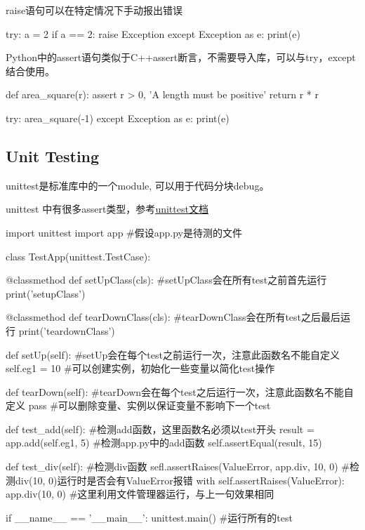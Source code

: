 raise语句可以在特定情况下手动报出错误
\begin{codeblock}[language=python, caption={Raise an error}]
  try:
  a = 2
  if a == 2:
  raise Exception
  except Exception as e:
  print(e)
\end{codeblock}

Python中的assert语句类似于C++assert断言，不需要导入库，可以与try，except结合使用。
\begin{codeblock}[language=python, caption={assert in python}]
  def area_square(r):
  assert r > 0, 'A length must be positive'
  return r * r
  
  try:
  area_square(-1)
  except Exception as e:
  print(e)
\end{codeblock}

\subsection{Unit Testing}
unittest是标准库中的一个module, 可以用于代码分块debug。 

unittest 中有很多assert类型，参考\href{https://docs.python.org/3/library/unittest.html#module-unittest}{\underline{unittest文档}}
\begin{codeblock}[language=python, caption={Unit Testing}]
  import unittest
  import app #假设app.py是待测的文件
  
  class TestApp(unittest.TestCase):
  
  @classmethod
  def setUpClass(cls): #setUpClass会在所有test之前首先运行
  print('setupClass')
  
  @classmethod
  def tearDownClass(cls): #tearDownClass会在所有test之后最后运行
  print('teardownClass')
  
  def setUp(self): #setUp会在每个test之前运行一次，注意此函数名不能自定义
  self.eg1 = 10 #可以创建实例，初始化一些变量以简化test操作
  
  def tearDown(self): #tearDown会在每个test之后运行一次，注意此函数名不能自定义
  pass #可以删除变量、实例以保证变量不影响下一个test
  
  def test_add(self): #检测add函数，这里函数名必须以test开头
  result = app.add(self.eg1, 5) #检测app.py中的add函数
  self.assertEqual(result, 15)
  
  def test_div(self): #检测div函数
  sefl.assertRaises(ValueError, app.div, 10, 0)
  #检测div(10, 0)运行时是否会有ValueError报错
  with self.assertRaises(ValueError):
  app.div(10, 0) #这里利用文件管理器运行，与上一句效果相同
  
  if __name__ == '__main__':
  unittest.main() #运行所有的test
\end{codeblock}

